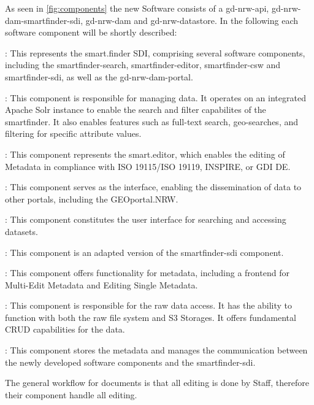 \documentclass[11pt, titlepage, a4paper]{article}
\begin{document}
As seen in \ref{fig:components} the new Software consists of a gd-nrw-api, gd-nrw-dam-smartfinder-sdi, gd-nrw-dam and gd-nrw-datastore.
In the following each software component will be shortly described:
\begin{description}[]
    \item[gd-nrw-dam-smartfinder-sdi]: This represents the smart.finder SDI, comprising several software components, including the smartfinder-search, smartfinder-editor, smartfinder-csw and smartfinder-sdi, as well as the gd-nrw-dam-portal.
          \begin{description}[]
              \item[smartfinder-search]: This component is responsible for managing data. It operates on an integrated Apache Solr instance to enable the search and filter capabilites of the smartfinder. It also enables features such as full-text search, geo-searches, and filtering for specific attribute values.
              \item[smartfinder-editor]: This component represents the smart.editor, which enables the editing of Metadata in compliance with ISO 19115/ISO 19119, INSPIRE, or GDI DE.
              \item[smartfinder-csw]: This component serves as the  interface, enabling the dissemination of data to other portals, including the GEOportal.NRW.
              \item[smartfinder-sdi]: This component constitutes the user interface for searching and accessing datasets.
              \item[gd-nrw-dam-portal]: This component is an adapted version of the smartfinder-sdi component.
          \end{description}
    \item[gd-nrw-dam]: This component offers  functionality for metadata, including a frontend for Multi-Edit Metadata and Editing Single Metadata.
    \item[gd-nrw-datastore]: This component is responsible for the raw data access. It has the ability to function with both the raw file system and S3 Storages. It offers fundamental CRUD capabilities for the data.
    \item[gd-nrw-api]: This component stores the metadata and manages the communication between the newly developed software components and the smartfinder-sdi.
\end{description}
The general workflow for documents is that all editing is done by  Staff, therefore their component handle all editing.
\end{document}
